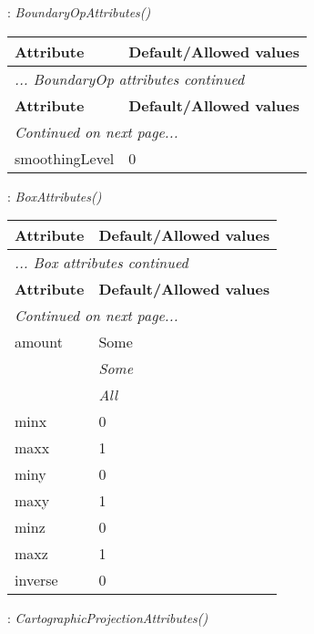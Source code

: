 \documentclass[10pt,a4paper]{report}
\begin{document}
\newpage

{}
: {\it BoundaryOpAttributes() }\\[-3mm]

\begin{longtable}{ll}
{\bf Attribute} & {\bf Default/Allowed values} \\
\hline \hline
\endfirsthead
\multicolumn{2}{l}{{\it ... BoundaryOp attributes continued}} \\
{\bf Attribute} & {\bf Default/Allowed values} \\
\hline \hline
\endhead
\hline
\multicolumn{2}{l}{{\it Continued on next page...}} \\
\endfoot
\hline
\endlastfoot

smoothingLevel  &  0 \\
\end{longtable}

\newpage

{}
: {\it BoxAttributes() }\\[-3mm]

\begin{longtable}{ll}
{\bf Attribute} & {\bf Default/Allowed values} \\
\hline \hline
\endfirsthead
\multicolumn{2}{l}{{\it ... Box attributes continued}} \\
{\bf Attribute} & {\bf Default/Allowed values} \\
\hline \hline
\endhead
\hline
\multicolumn{2}{l}{{\it Continued on next page...}} \\
\endfoot
\hline
\endlastfoot

amount  &  Some   \\
 & {\it  Some} \\
 & {\it  All} \\
minx  &  0 \\
maxx  &  1 \\
miny  &  0 \\
maxy  &  1 \\
minz  &  0 \\
maxz  &  1 \\
inverse  &  0 \\
\end{longtable}

\newpage

{}
: {\it CartographicProjectionAttributes() }\\[-3mm]
\end{document}
